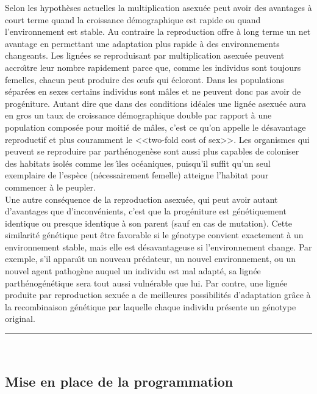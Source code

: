 \documentclass[11pt,twoside,a4paper]{article}
\begin{document}
Selon les hypoth{\`e}ses actuelles la multiplication asexu{\'e}e peut avoir des avantages {\`a} court terme quand la croissance d{\'e}mographique est rapide ou quand l'environnement est stable. Au contraire la reproduction offre {\`a} long terme un net avantage en permettant une adaptation plus rapide {\`a} des environnements changeants. Les lign{\'e}es se reproduisant par multiplication asexu{\'e}e peuvent accro{\^\i}tre leur nombre rapidement parce que, comme les individus sont toujours femelles, chacun peut produire des \oe ufs qui {\'e}cloront. Dans les populations s{\'e}par{\'e}es en sexes certains individus sont m{\^a}les et ne peuvent donc pas avoir de prog{\'e}niture. Autant dire que dans des conditions id{\'e}ales une lign{\'e}e asexu{\'e}e aura en gros un taux de croissance d{\'e}mographique double par rapport {\`a} une population compos{\'e}e pour moiti{\'e} de m{\^a}les, c'est ce qu'on appelle le d{\'e}savantage reproductif et plus couramment le <<two-fold cost of sex>>. Les organismes qui peuvent se reproduire par parth{\'e}nogen{\`e}se sont aussi plus capables de coloniser des habitats isol{\'e}s comme les {\^\i}les oc{\'e}aniques, puisqu'il suffit qu'un seul exemplaire de l'esp{\`e}ce (n{\'e}cessairement femelle) atteigne l'habitat pour commencer {\`a} le peupler.~\\

Une autre cons{\'e}quence de la reproduction asexu{\'e}e, qui peut avoir autant d'avantages que d'inconv{\'e}nients, c'est que la prog{\'e}niture est g{\'e}n{\'e}tiquement identique ou presque identique {\`a} son parent (sauf en cas de mutation). Cette similarit{\'e} g{\'e}n{\'e}tique peut {\^e}tre favorable si le g{\'e}notype convient exactement {\`a} un environnement stable, mais elle est d{\'e}savantageuse si l'environnement change. Par exemple, s'il appara{\^\i}t un nouveau pr{\'e}dateur, un nouvel environnement, ou un nouvel agent pathog{\`e}ne auquel un individu est mal adapt{\'e}, sa lign{\'e}e parth{\'e}nog{\'e}n{\'e}tique sera tout aussi vuln{\'e}rable que lui. Par contre, une lign{\'e}e produite par reproduction sexu{\'e}e a de meilleures possibilit{\'e}s d'adaptation gr{\^a}ce {\`a} la recombinaison g{\'e}n{\'e}tique par laquelle chaque individu pr{\'e}sente un g{\'e}notype original.~\\

\rule{10cm}{0.5mm}~\\

\subsection{Mise en place de la programmation}
\end{document}
